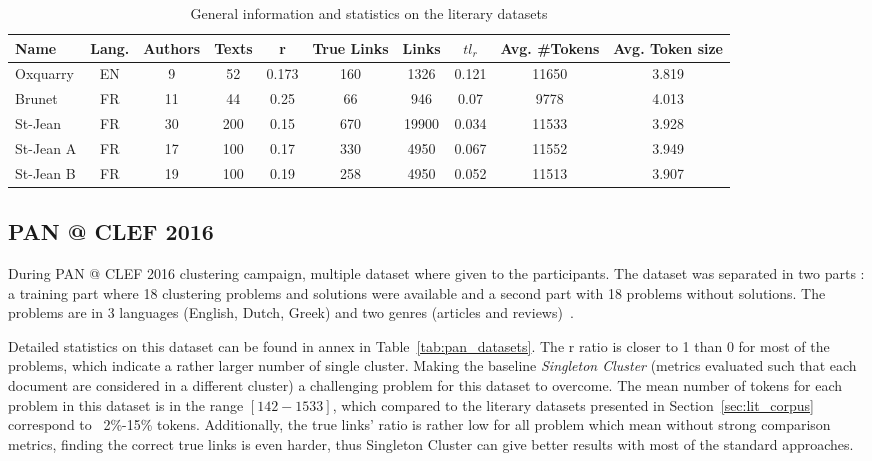 \begin{table*}
  \centering
  \caption{General information and statistics on the literary datasets}
  \label{tab:lit_datasets}
  \begin{tabular}{ l c c c c c c c c c }
    \toprule
    \textbf{Name} &
    \textbf{Lang.} &
    \textbf{Authors} &
    \textbf{Texts} &
    \textbf{r} &
    \textbf{True Links} &
    \textbf{Links} &
    \textbf{$tl_r$} &
    \textbf{Avg. \#Tokens} &
    \textbf{Avg. Token size} \\
    \midrule
    Oxquarry & EN & 9 & 52 & 0.173 & 160 & 1326 & 0.121 & 11650 & 3.819 \\
    Brunet & FR & 11 & 44 & 0.25 & 66 & 946 & 0.07 & 9778 & 4.013 \\
    St-Jean & FR & 30 & 200 & 0.15 & 670 & 19900 & 0.034 & 11533 & 3.928 \\
    St-Jean A & FR & 17 & 100 & 0.17 & 330 & 4950 & 0.067 & 11552 & 3.949 \\
    St-Jean B & FR & 19 & 100 & 0.19 & 258 & 4950 & 0.052 & 11513 & 3.907 \\
    \bottomrule
  \end{tabular}
\end{table*}


\subsection{PAN @ CLEF 2016}

During PAN @ CLEF 2016 clustering campaign, multiple dataset where given to the participants.
The dataset was separated in two parts : a training part where 18 clustering problems and solutions were available and a second part with 18 problems without solutions.
The problems are in 3 languages (English, Dutch, Greek) and two genres (articles and reviews)~\cite{pan16}.

Detailed statistics on this dataset can be found in annex in Table~\ref{tab:pan_datasets}.
The r ratio is closer to 1 than 0 for most of the problems, which indicate a rather larger number of single cluster.
Making the baseline \textit{Singleton Cluster} (metrics evaluated such that each document are considered in a different cluster) a challenging problem for this dataset to overcome.
The mean number of tokens for each problem in this dataset is in the range $[142-1533]$, which compared to the literary datasets presented in Section~\ref{sec:lit_corpus} correspond to ~2\%-15\% tokens.
Additionally, the true links' ratio is rather low for all problem which mean without strong comparison metrics, finding the correct true links is even harder, thus Singleton Cluster can give better results with most of the standard approaches.
